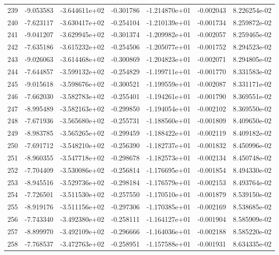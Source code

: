 \begin{tabular}{rrrrrrr}
 239 &  -9.053583 & -3.644611e+02 & -0.301786 & -1.214870e+01 &  -0.002043 &  8.226254e-02 \\
 240 &  -7.623117 & -3.630417e+02 & -0.254104 & -1.210139e+01 &  -0.001734 &  8.259872e-02 \\
 241 &  -9.041207 & -3.629945e+02 & -0.301374 & -1.209982e+01 &  -0.002057 &  8.259465e-02 \\
 242 &  -7.635186 & -3.615232e+02 & -0.254506 & -1.205077e+01 &  -0.001752 &  8.294523e-02 \\
 243 &  -9.026063 & -3.614468e+02 & -0.300869 & -1.204823e+01 &  -0.002071 &  8.294805e-02 \\
 244 &  -7.644857 & -3.599132e+02 & -0.254829 & -1.199711e+01 &  -0.001770 &  8.331583e-02 \\
 245 &  -9.015618 & -3.598676e+02 & -0.300521 & -1.199559e+01 &  -0.002087 &  8.331171e-02 \\
 246 &  -7.662030 & -3.582783e+02 & -0.255401 & -1.194261e+01 &  -0.001790 &  8.369551e-02 \\
 247 &  -8.995489 & -3.582163e+02 & -0.299850 & -1.194054e+01 &  -0.002102 &  8.369550e-02 \\
 248 &  -7.671936 & -3.565680e+02 & -0.255731 & -1.188560e+01 &  -0.001809 &  8.409650e-02 \\
 249 &  -8.983785 & -3.565265e+02 & -0.299459 & -1.188422e+01 &  -0.002119 &  8.409182e-02 \\
 250 &  -7.691712 & -3.548210e+02 & -0.256390 & -1.182737e+01 &  -0.001832 &  8.450996e-02 \\
 251 &  -8.960355 & -3.547718e+02 & -0.298678 & -1.182573e+01 &  -0.002134 &  8.450748e-02 \\
 252 &  -7.704409 & -3.530086e+02 & -0.256814 & -1.176695e+01 &  -0.001854 &  8.494330e-02 \\
 253 &  -8.945516 & -3.529736e+02 & -0.298184 & -1.176579e+01 &  -0.002153 &  8.493764e-02 \\
 254 &  -7.726501 & -3.511530e+02 & -0.257550 & -1.170510e+01 &  -0.001879 &  8.539150e-02 \\
 255 &  -8.919176 & -3.511156e+02 & -0.297306 & -1.170385e+01 &  -0.002169 &  8.538685e-02 \\
 256 &  -7.743340 & -3.492380e+02 & -0.258111 & -1.164127e+01 &  -0.001904 &  8.585909e-02 \\
 257 &  -8.899970 & -3.492109e+02 & -0.296666 & -1.164036e+01 &  -0.002188 &  8.585220e-02 \\
 258 &  -7.768537 & -3.472763e+02 & -0.258951 & -1.157588e+01 &  -0.001931 &  8.634335e-02 \\

\end{tabular}

